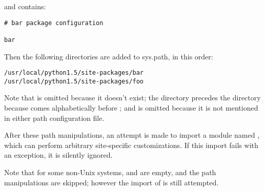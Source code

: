 and  contains:

\bcode\begin{verbatim}
# bar package configuration

bar
\end{verbatim}\ecode

Then the following directories are added to sys.path, in this order:

\bcode\begin{verbatim}
/usr/local/python1.5/site-packages/bar
/usr/local/python1.5/site-packages/foo
\end{verbatim}\ecode

Note that  is omitted because it doesn't exist; the
 directory precedes the  directory because
 comes alphabetically before ; and
 is omitted because it is not mentioned in either path
configuration file.

After these path manipulations, an attempt is made to import a module
named , which can perform arbitrary site-specific
customizations.  If this import fails with an 
exception, it is silently ignored.

Note that for some non-Unix systems,  and
 are empty, and the path manipulations are
skipped; however the import of  is still attempted.
